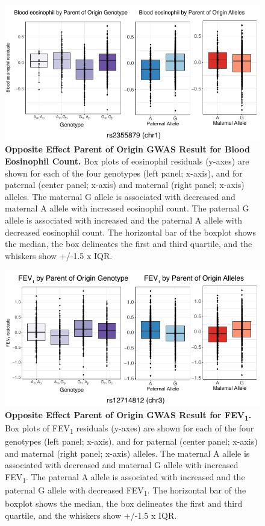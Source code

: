 \begin{figure}[!htb]
\centering
\includegraphics[width=5in]{img/ch02/fig-s12.pdf}
\caption[Opposite Effect Parent of Origin GWAS Result for Blood Eosinophil Count.]{\textbf{Opposite Effect Parent of Origin GWAS Result for Blood Eosinophil Count.}  Box plots of eosinophil residuals (y-axes) are shown for each of the four genotypes (left panel; x-axis), and for paternal (center panel; x-axis) and maternal (right panel; x-axis) alleles. The maternal G allele is associated with decreased and maternal A allele with increased eosinophil count. The paternal G allele is associated with increased and the paternal A allele with decreased eosinophil count. The horizontal bar of the boxplot shows the median, the box delineates the first and third quartile, and the whiskers show +/-1.5 x IQR.}
\label{fig:fig-s12}
\end{figure}

\begin{figure}[!htb]
\centering
\includegraphics[width=5in]{img/ch02/fig-s13.pdf}
\caption[Opposite Effect Parent of Origin GWAS Result for FEV\textsubscript{1}.]{\textbf{Opposite Effect Parent of Origin GWAS Result for FEV\textsubscript{1}.} Box plots of FEV\textsubscript{1} residuals (y-axes) are shown for each of the four genotypes (left panel; x-axis), and for paternal (center panel; x-axis) and maternal (right panel; x-axis) alleles. The maternal A allele is associated with decreased and maternal G allele with increased FEV\textsubscript{1}. The paternal A allele is associated with increased and the paternal G allele with decreased FEV\textsubscript{1}. The horizontal bar of the boxplot shows the median, the box delineates the first and third quartile, and the whiskers show +/-1.5 x IQR.}
\label{fig:fig-s13}
\end{figure}

